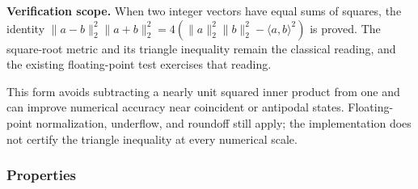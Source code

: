 \documentclass[
  10pt,
]{article}
\begin{document}
\textbf{Verification scope.} When two integer vectors have equal sums of squares, the identity \protect\hypertarget{math-E0142-0176}{}{\(\|a-b\|_2^2 \|a+b\|_2^2 = 4(\|a\|_2^2 \|b\|_2^2 - \langle a,b\rangle^2)\)} is proved. The square-root metric and its triangle inequality remain the classical reading, and the existing floating-point test exercises that reading.

This form avoids subtracting a nearly unit squared inner product from one and can improve numerical accuracy near coincident or antipodal states. Floating-point normalization, underflow, and roundoff still apply; the implementation does not certify the triangle inequality at every numerical scale.

\subsubsection{Properties}\label{properties}
\end{document}

